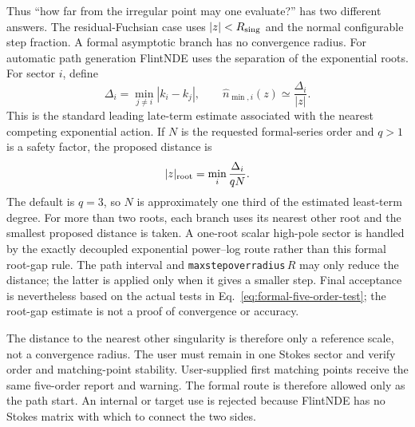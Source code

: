 \documentclass[11pt]{article}
\renewcommand{\_}{\origunderscore\allowbreak}
\begin{document}
Thus ``how far from the irregular point may one evaluate?'' has two different answers.  The
residual-Fuchsian case uses $|z|<R_{\rm sing}$ and the normal configurable step fraction.  A
formal asymptotic branch has no convergence radius.  For automatic path generation FlintNDE
uses the separation of the exponential roots.  For sector $i$, define
\begin{equation}
 \Delta_i=\min_{j\ne i}|k_i-k_j|,
 \qquad
 \widehat n_{\min,i}(z)\simeq\frac{\Delta_i}{|z|}.
 \label{eq:formal-root-gap-estimate}
\end{equation}
This is the standard leading late-term estimate associated with the nearest competing
exponential action.  If $N$ is the requested formal-series order and $q>1$ is a safety factor,
the proposed distance is
\begin{equation}
 |z|_{\rm root}=\min_i\frac{\Delta_i}{qN}.
 \label{eq:formal-root-gap-point}
\end{equation}
The default is $q=3$, so $N$ is approximately one third of the estimated least-term degree.  For more
than two roots, each branch uses its nearest other root and the smallest proposed distance is
taken.  A one-root scalar high-pole sector is handled by the exactly decoupled exponential
power--log route rather than this formal root-gap rule.  The path interval and
\texttt{max\_step\_over\_radius}$\,R$ may only reduce the distance; the latter is applied only
when it gives a smaller step.  Final acceptance is nevertheless based on the actual tests in
Eq.~\eqref{eq:formal-five-order-test}; the root-gap estimate is not a proof of convergence or
accuracy.

The distance to the nearest other singularity is therefore only a reference scale, not a
convergence radius.  The user must remain in one Stokes sector and verify order and
matching-point stability.  User-supplied first matching points receive the same five-order
report and warning.  The
formal route is therefore allowed only as the path start.  An internal or target use is
rejected because FlintNDE has no Stokes matrix with which to connect the two sides.
\end{document}
